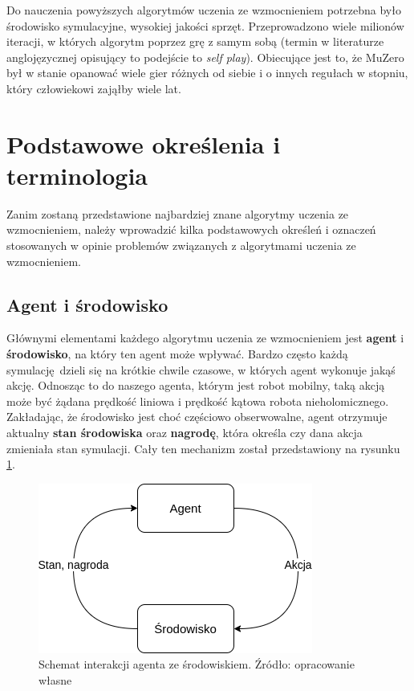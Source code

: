 Do nauczenia powyższych algorytmów uczenia ze wzmocnieniem potrzebna było 
środowisko symulacyjne, wysokiej jakości sprzęt. Przeprowadzono wiele milionów 
iteracji, w których algorytm poprzez grę z samym sobą (termin w literaturze 
anglojęzycznej opisujący to podejście to \textit{self play}). Obiecujące jest 
to, że MuZero był w stanie opanować wiele gier różnych od siebie i o innych 
regułach w stopniu, który człowiekowi zająłby wiele lat.

\section{Podstawowe określenia i terminologia}

Zanim zostaną przedstawione najbardziej znane algorytmy uczenia ze 
wzmocnieniem, należy wprowadzić kilka podstawowych określeń i oznaczeń 
stosowanych w opinie problemów związanych z algorytmami uczenia ze wzmocnieniem.

\subsection{Agent i środowisko}

Głównymi elementami każdego algorytmu uczenia ze wzmocnieniem jest 
\textbf{agent} i \textbf{środowisko}, na który ten agent może wpływać. Bardzo 
często każdą symulację dzieli się na krótkie chwile czasowe, w których agent 
wykonuje jakąś akcję. Odnosząc to do naszego agenta, którym jest robot mobilny, 
taką akcją może być żądana prędkość liniowa i prędkość kątowa robota 
nieholomicznego. Zakładając, że środowisko jest choć częściowo obserwowalne, 
agent otrzymuje aktualny \textbf{stan środowiska} oraz \textbf{nagrodę}, która 
określa czy dana akcja zmieniała stan symulacji. Cały ten 
mechanizm został przedstawiony na rysunku \ref{fig:rlschematagentsrodowisko}.

\begin{figure}[H]
	\centering
	\includegraphics[width=0.5\linewidth]{rozdzial3/images/rl_schemat_agent_srodowisko}
	\caption{Schemat interakcji agenta ze środowiskiem. Źródło: opracowanie 
	własne}
	\label{fig:rlschematagentsrodowisko}
\end{figure}

